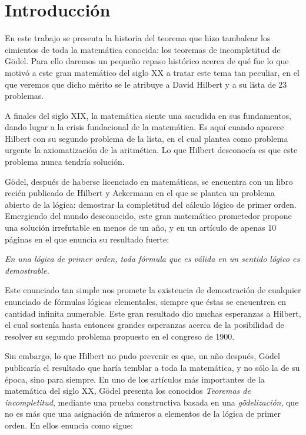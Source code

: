 %


\chapter{Introducción}

En este trabajo se presenta la historia del teorema que hizo tambalear los cimientos de toda la matemática conocida:
los teoremas de incompletitud de Gödel. Para ello daremos un pequeño repaso histórico acerca de qué fue lo 
que motivó a este gran matemático del siglo XX a tratar este tema tan peculiar, en el que veremos que dicho 
mérito se le atribuye a David Hilbert y a su lista de 23 problemas.

A finales del siglo XIX, la matemática  siente una sacudida en sus fundamentos, dando lugar a la crisis fundacional
de la matemática. Es aquí cuando aparece Hilbert con su segundo problema de la lista, en el cual plantea como 
problema urgente la axiomatización de la aritmética. Lo que Hilbert desconocía es que este problema nunca tendría solución.

Gödel, después de haberse licenciado en matemáticas, se encuentra con un libro recién publicado de Hilbert y Ackermann en el que se plantea
un problema abierto de la lógica: demostrar la completitud del cálculo lógico 
de primer orden. Emergiendo del mundo desconocido, este gran matemático prometedor propone una solución irrefutable en menos de un año, 
y en un artículo de apenas 10 páginas en el que enuncia su resultado fuerte:

\begin{center}
    \textit{En una lógica de primer orden, toda fórmula que es válida en un sentido lógico es demostrable.}
\end{center}

Este enunciado tan simple nos promete la existencia de demostración de cualquier enunciado de fórmulas lógicas elementales, siempre
que éstas se encuentren en cantidad infinita numerable. Este gran resultado dio muchas esperanzas a Hilbert, el cual sostenía 
hasta entonces grandes esperanzas acerca de la posibilidad de resolver su segundo problema propuesto en el congreso de 1900.

Sin embargo, lo que Hilbert no pudo prevenir es que, un año después, Gödel publicaría el resultado que haría temblar a toda la matemática, 
y no sólo la de su época, sino para siempre. En uno de los artículos más importantes de la matemática del siglo XX, Gödel presenta los 
conocidos \textit{Teoremas de incompletitud}, mediante una prueba constructiva basada en una \textit{gödelización}, que no es más que una asignación
de números a elementos de la lógica de primer orden. En ellos enuncia como sigue:

